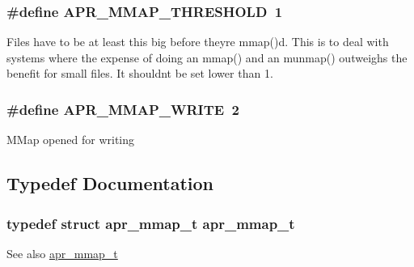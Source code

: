 \subsubsection[{\texorpdfstring{A\+P\+R\+\_\+\+M\+M\+A\+P\+\_\+\+T\+H\+R\+E\+S\+H\+O\+LD}{APR_MMAP_THRESHOLD}}]{\setlength{\rightskip}{0pt plus 5cm}\#define A\+P\+R\+\_\+\+M\+M\+A\+P\+\_\+\+T\+H\+R\+E\+S\+H\+O\+LD~1}\hypertarget{group__apr__mmap_ga19d1916e7b64bfb1a969648fe7b0846a}{}\label{group__apr__mmap_ga19d1916e7b64bfb1a969648fe7b0846a}
Files have to be at least this big before they\textquotesingle{}re mmap()d. This is to deal with systems where the expense of doing an mmap() and an munmap() outweighs the benefit for small files. It shouldn\textquotesingle{}t be set lower than 1. 
\subsubsection[{\texorpdfstring{A\+P\+R\+\_\+\+M\+M\+A\+P\+\_\+\+W\+R\+I\+TE}{APR_MMAP_WRITE}}]{\setlength{\rightskip}{0pt plus 5cm}\#define A\+P\+R\+\_\+\+M\+M\+A\+P\+\_\+\+W\+R\+I\+TE~2}\hypertarget{group__apr__mmap_gac2eb7f697d8bf190e630b85f967c8273}{}\label{group__apr__mmap_gac2eb7f697d8bf190e630b85f967c8273}
M\+Map opened for writing 

\subsection{Typedef Documentation}
\subsubsection[{\texorpdfstring{apr\+\_\+mmap\+\_\+t}{apr_mmap_t}}]{\setlength{\rightskip}{0pt plus 5cm}typedef struct {\bf apr\+\_\+mmap\+\_\+t} {\bf apr\+\_\+mmap\+\_\+t}}\hypertarget{group__apr__mmap_ga766b01a3e1e0438d06dc88d76f826f80}{}\label{group__apr__mmap_ga766b01a3e1e0438d06dc88d76f826f80}
\begin{DoxySeeAlso}{See also}
\hyperlink{structapr__mmap__t}{apr\+\_\+mmap\+\_\+t} 
\end{DoxySeeAlso}


